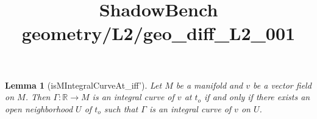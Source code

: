 \documentclass{article}
\title{ShadowBench geometry/L2/geo\_diff\_L2\_001}
\newtheorem{lemma}{Lemma}
\begin{document}
\maketitle

\begin{lemma}[isMIntegralCurveAt_iff']
Let $M$ be a manifold and $v$ be a vector field on $M$. Then $\Gamma : ℝ → M$ is an integral curve of $v$ at $t_o$ 
if and only if there exists an open neighborhood $U$ of $t_o$ such that $\Gamma$ is an integral curve of $v$ on $U$.
\end{lemma}
\end{document}
